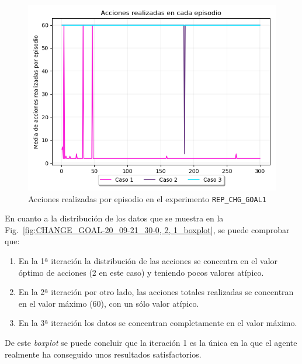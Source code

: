 \begin{figure}
    \centering
    \includegraphics[scale=0.4]{cap5_experimentacion/images/CHANGE_GOAL-20_09-21_30-0, 2, 1_acciones.png}
    \caption{Acciones realizadas por episodio en el experimento \texttt{REP\_CHG\_GOAL1}}
    \label{fig:CHANGE_GOAL-20_09-21_30-0, 2, 1_acciones}
\end{figure}

En cuanto a la distribución de los datos que se muestra en la Fig.~\ref{fig:CHANGE_GOAL-20_09-21_30-0, 2, 1_boxplot}, se puede comprobar que: 
\begin{enumerate}
    \item En la 1ª iteración la distribución de las acciones se concentra en el valor óptimo de acciones (2 en este caso) y teniendo pocos valores atípico.
    \item En la 2ª iteración por otro lado, las acciones totales realizadas se concentran en el valor máximo (60), con un sólo valor atípico.
    \item En la 3ª iteración los datos se concentran completamente en el valor máximo.
\end{enumerate}

De este \textit{boxplot} se puede concluir que la iteración 1 es la única en la que el agente realmente ha conseguido unos resultados satisfactorios. \\

